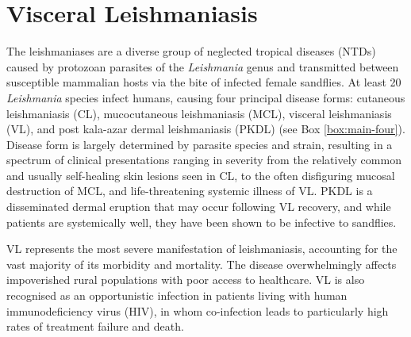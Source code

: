 \section{Visceral Leishmaniasis}
The leishmaniases are a diverse group of neglected tropical diseases (NTDs) caused by protozoan parasites of the \textit{Leishmania} genus and transmitted between susceptible mammalian hosts via the bite of infected female sandflies\cite{pareyn2025}. At least 20 \textit{Leishmania} species infect humans, causing four principal disease forms: cutaneous leishmaniasis (CL), mucocutaneous leishmaniasis (MCL), visceral leishmaniasis (VL), and post kala-azar dermal leishmaniasis (PKDL) (see Box \ref{box:main-four})\cite{farrar2023manson, burza2018, pareyn2025, who_leish}. Disease form is largely determined by parasite species and strain, resulting in a spectrum of clinical presentations ranging in severity from the relatively common and usually self-healing skin lesions seen in CL, to the often disfiguring mucosal destruction of MCL, and life-threatening systemic illness of VL. PKDL is a disseminated dermal eruption that may occur following VL recovery, and while patients are systemically well, they have been shown to be infective to sandflies\cite{burza2018}.

VL represents the most severe manifestation of leishmaniasis, accounting for the vast majority of its morbidity and mortality. The disease overwhelmingly affects impoverished rural populations with poor access to healthcare. VL is also recognised as an opportunistic infection in patients living with human immunodeficiency virus (HIV), in whom co-infection leads to particularly high rates of treatment failure and death.

